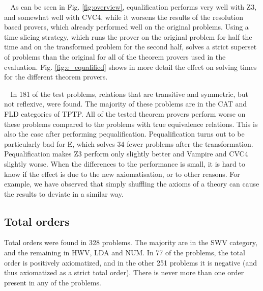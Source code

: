 \documentclass{article}
\renewcommand{\paragraph}[1]{\vspace{0.2cm}\noindent {\bf #1} $\;\;$}
\begin{document}
\paragraph{Equalification}
As can be seen in Fig. \ref{fig:overview}, equalification performs very well with Z3, and somewhat well with CVC4, while it worsens the results of the resolution based provers, which already performed well on the original problems. %
Using a time slicing strategy, which runs the prover on the original problem for half the time and on the transformed problem for the second half, solves a strict superset of problems than the original for all of the theorem provers used in the evaluation. Fig. \ref{fig:e_equalified} shows in more detail the effect on solving times for the different theorem provers.


\paragraph{Pequalification}
In 181 of the test problems, relations that are transitive and symmetric, but not reflexive, were found. The majority of these problems are in the CAT and FLD categories of TPTP. All of the tested theorem provers perform worse on these problems compared to the problems with true equivalence relations. This is also the case after performing pequalification. Pequalification turns out to be particularly bad for E, which solves 34 fewer problems after the transformation. Pequalification makes Z3 perform only slightly better and Vampire and CVC4 slightly worse. 
When the differences to the performance is small, it is hard to know if the effect is due to the new axiomatisation, or to other reasons. For example, we have observed that simply shuffling the axioms of a theory can cause the results to deviate in a similar way. 

\subsection{Total orders}
Total orders were found in 328 problems. The majority are in the SWV category, and the remaining in HWV, LDA and NUM.  In 77 of the problems, the total order is positively axiomatized, and in the other 251 problems it is negative (and thus axiomatized as a strict total order). There is never more than one order present in any of the problems. 
\end{document}
